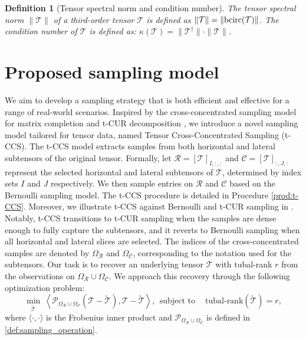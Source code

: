 \documentclass[twoside,12pt]{article}
\newtheorem{definition}{Definition}
\def\bcirc{\textnormal{bcirc}}
\def\tX{\mathcal{T}}
\def\bcirc{\textnormal{bcirc}}
\def\tX{\mathcal{T}}
\begin{document}
\begin{definition}[Tensor spectral norm and condition number]\label{spectral_condition_number}\rm 
The tensor spectral norm $\|\mathcal{T}\|$ of a third-order tensor $\mathcal{T}$ is defined as $\|\mathcal{T}\|=\|\bcirc(\mathcal{T})\|$. The condition number of $\mathcal{T}$ is defined as:
$
\kappa(\mathcal{T}) = \|\mathcal{T}^{\dagger}\|\cdot \|\mathcal{T}\|$.
\end{definition}

\section{Proposed sampling model}\label{sampling_model}
We aim to develop a sampling strategy that is both efficient and effective for a range of real-world scenarios. Inspired by the cross-concentrated sampling model for matrix completion \citep{cai2023matrix} and t-CUR decomposition \citep{Tarzanagh2018}, we introduce a novel sampling model tailored for tensor data, named Tensor Cross-Concentrated Sampling (t-CCS). The t-CCS model extracts samples from both horizontal and lateral subtensors of the original tensor. Formally, let \(\mathcal{R} = [\mathcal{T}]_{I,:,:}\) and \(\mathcal{C} = [\mathcal{T}]_{:,J,:}\) represent the selected horizontal and lateral subtensors of \(\mathcal{T}\), determined by index sets \(I\) and \(J\) respectively. We then sample entries on \(\mathcal{R}\) and \(\mathcal{C}\) based on the Bernoulli sampling model. The t-CCS procedure is detailed in Procedure \ref{prod:t-CCS}. Moreover, we illustrate t-CCS against Bernoulli  and t-CUR sampling in . Notably, t-CCS transitions to t-CUR sampling when the samples are dense enough to fully capture the subtensors, and it reverts to Bernoulli sampling when all horizontal and lateral slices are selected. 
The indices of the cross-concentrated samples are denoted by \(\Omega_{\mathcal{R}}\) and \(\Omega_{\mathcal{C}}\), corresponding to the notation used for the subtensors. Our task is to recover an underlying tensor \(\mathcal{T}\) with tubal-rank \(r\) from the observations on \(\Omega_{\mathcal{R}} \cup \Omega_{\mathcal{C}}\).  We approach this recovery through the following optimization problem:  
\begin{equation}  
    \min_{\widetilde{\tX}}~
\left\langle\mathcal{P}_{\Omega_{\mathcal{R}}\cup \Omega_{\mathcal{C}}}(\tX-\widetilde{\tX}), \tX-\widetilde{\tX}\right\rangle, ~~
\text{subject to}~\quad \text{tubal-rank}(\widetilde{\tX})= r,
\end{equation}   
where $\langle \cdot,\cdot\rangle$ is the Frobenius inner product and $\mathcal{P}_{\Omega_{\mathcal{R}}\cup \Omega_{\mathcal{C}}}$ is defined in \eqref{def:sampling_operation}.
 
\end{document}
